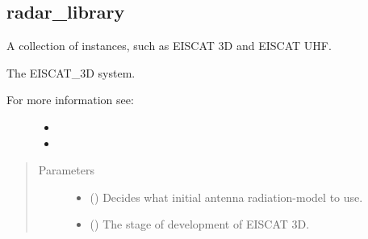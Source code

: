 \documentclass[letterpaper,10pt,english]{sphinxmanual}
\begin{document}
\subsection{radar\_library}
\label{\detokenize{modules/radar_library:module-radar_library}}\label{\detokenize{modules/radar_library:radar-library}}\label{\detokenize{modules/radar_library::doc}}
A collection of {\hyperref[\detokenize{modules/radar_config:radar_config.RadarSystem}]{}} instances, such as EISCAT 3D and EISCAT UHF.

\begin{fulllineitems}
\label{\detokenize{modules/radar_library:radar_library.eiscat_3d}}
The EISCAT\_3D system.
\begin{description}
\item[{For more information see:}] \leavevmode\begin{itemize}
\item {} 

\item {} 

\end{itemize}

\end{description}
\begin{quote}\begin{description}
\item[{Parameters}] \leavevmode\begin{itemize}
\item {} 
 () \textendash{} Decides what initial antenna radiation-model to use.

\item {} 
 () \textendash{} The stage of development of EISCAT 3D.

\end{itemize}

\end{description}\end{quote}


\end{fulllineitems}
\end{document}
